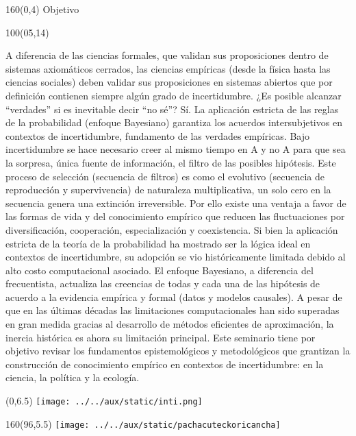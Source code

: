 \documentclass[shownotes,aspectratio=169]{beamer}
\begin{document}
\begin{frame}

\begin{textblock}{160}(0,4)\centering
\LARGE Objetivo
\end{textblock}


\begin{textblock}{100}(05,14) \footnotesize
\parbox{15cm}{A diferencia de las ciencias formales, que validan sus proposiciones dentro de sistemas axiomáticos cerrados, las ciencias empíricas (desde la física hasta las ciencias sociales) deben validar sus proposiciones en sistemas abiertos que por definición contienen siempre algún grado de incertidumbre. ¿Es posible alcanzar ``verdades'' si es inevitable decir ``no sé''? Sí. La aplicación estricta de las reglas de la probabilidad (enfoque Bayesiano) garantiza los acuerdos intersubjetivos en contextos de incertidumbre, fundamento de las verdades empíricas. Bajo incertidumbre se hace necesario creer al mismo tiempo en A y no A para que sea la sorpresa, única fuente de información, el filtro de las posibles hipótesis. Este proceso de selección (secuencia de filtros) es como el evolutivo (secuencia de reproducción y supervivencia) de naturaleza multiplicativa, un solo cero en la secuencia genera una extinción irreversible. Por ello existe una ventaja a favor de las formas de vida y del conocimiento empírico que reducen las fluctuaciones por diversificación, cooperación, especialización y coexistencia. Si bien la aplicación estricta de la teoría de la probabilidad ha mostrado ser la lógica ideal en contextos de incertidumbre, su adopción se vio históricamente limitada debido al alto costo computacional asociado. El enfoque Bayesiano, a diferencia del frecuentista, actualiza las creencias de todas y cada una de las hipótesis de acuerdo a la evidencia empírica y formal (datos y modelos causales). A pesar de que en las últimas décadas las limitaciones computacionales han sido superadas en gran medida gracias al desarrollo de métodos eficientes de aproximación, la inercia histórica es ahora su limitación principal. Este seminario tiene por objetivo revisar los fundamentos epistemológicos y metodológicos que grantizan la construcción de conocimiento empírico en contextos de incertidumbre: en la ciencia, la política y la ecología.}
\end{textblock}

\end{frame}

\begin{frame}

\begin{textblock}{96}(0,6.5)\centering
{\texttt{[image: ../../aux/static/inti.png]}}
\end{textblock}

\begin{textblock}{160}(96,5.5)
\texttt{[image: ../../aux/static/pachacuteckoricancha]}
\end{textblock}

\end{frame}
\end{document}
